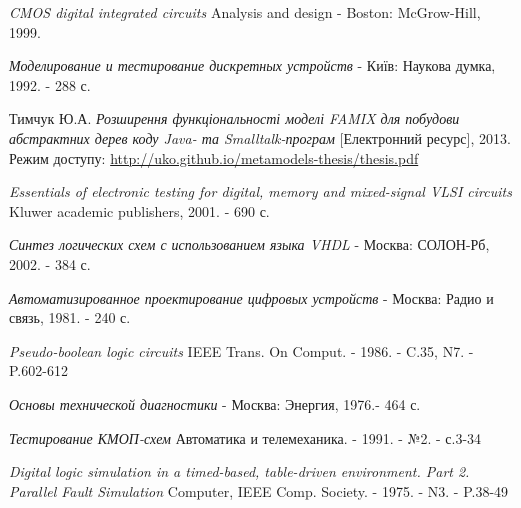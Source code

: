 \documentclass[12pt,a4paper]{article}
\begin{document}
\begin{thebibliography}{9}
  \emph{CMOS digital integrated circuits}
    Analysis and design - Boston: McGrow-Hill, 1999.

  \emph{Моделирование и тестирование дискретных устройств}
     - Київ: Наукова думка, 1992. - 288 с.

  Тимчук Ю.А. \emph{Розширення функціональності моделі FAMIX для побудови
абстрактних дерев коду Java- та Smalltalk-програм}
    [Електронний ресурс], 2013. Режим доступу:
    \url{http://uko.github.io/metamodels-thesis/thesis.pdf}

  \emph{Essentials of electronic testing for digital, memory and mixed-signal VLSI circuits}
    Kluwer academic publishers, 2001. - 690 с.

  \emph{Синтез логических схем с использованием языка VHDL}
     - Москва: СОЛОН-Рб, 2002. - 384 с.

  \emph{Автоматизированное проектирование цифровых устройств}
     - Москва: Радио и связь, 1981. - 240 с.

  \emph{Pseudo-boolean logic circuits}
    IEEE Trans. On Comput. - 1986. - C.35, N7. - P.602-612

  \emph{Основы технической диагностики}
     - Москва: Энергия, 1976.- 464 с.

  \emph{Тестирование КМОП-схем}
    Автоматика и телемеханика. - 1991. - №2. - с.3-34

  \emph{Digital logic simulation in a timed-based, table-driven environment. Part 2. Parallel Fault Simulation}
    Computer, IEEE Comp. Society. - 1975. - N3. - P.38-49

\end{thebibliography}
\end{document}
